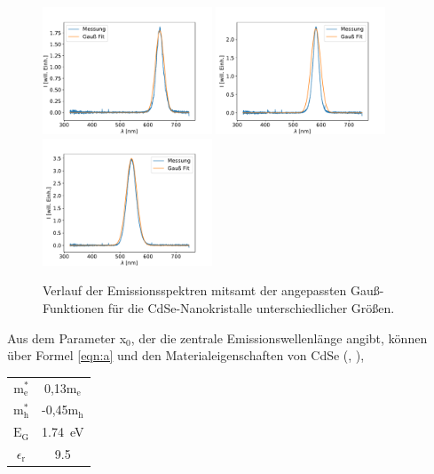         \begin{figure}[h]
        \centering
        \includegraphics[width = 0.45\textwidth]{Kristall_1.pdf}
        \includegraphics[width = 0.45\textwidth]{Kristall_2.pdf}
        \includegraphics[width = 0.45\textwidth]{Kristall_3.pdf}
        \label{fig:size_kol}
        \caption{Verlauf der Emissionsspektren mitsamt der angepassten Gauß-Funktionen für die CdSe-Nanokristalle unterschiedlicher Größen.}
        \end{figure}

        \FloatBarrier
        \newpage
        Aus dem Parameter x$_0$, der die zentrale Emissionswellenlänge angibt, können über Formel \ref{eqn:a} und den Materialeigenschaften von CdSe 
        (\cite{tu_dortmund_versuchsanleitung_nodate-1}, \cite{foll_semiconductors_nodate}),

        \begin{center}
            \label{tab:prop_CdSe}
            \begin{tabular}{c c}
                \toprule
                $\text{m}_{\text{e}}^*$ &  0,13$\text{m}_{\text{e}}$\\
                $\text{m}_{\text{h}}^*$ &  -0,45$\text{m}_{\text{h}}$\\
                $\text{E}_{\text{G}}$ &  \SI{1.74}{\electronvolt}\\
                $\epsilon_{\text{r}}$ &  \num{9.5}\\
                \bottomrule
            \end{tabular}
        \end{center}


